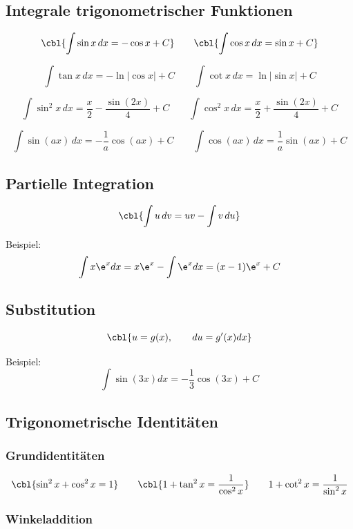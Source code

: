 \subsection{Integrale trigonometrischer Funktionen}

\[
\cbl{\int \sin x \, dx = - \cos x + C}
\qquad
\cbl{\int \cos x \, dx = \sin x + C}
\]

\[
\int \tan x \, dx = - \ln |\cos x| + C
\qquad
\int \cot x \, dx = \ln |\sin x| + C
\]

\[
\int \sin^2 x \, dx = \frac{x}{2} - \frac{\sin(2x)}{4} + C
\qquad
\int \cos^2 x \, dx = \frac{x}{2} + \frac{\sin(2x)}{4} + C
\]

\[
\int \sin(ax) \, dx = -\frac{1}{a}\cos(ax) + C
\qquad
\int \cos(ax) \, dx = \frac{1}{a}\sin(ax) + C
\]

\subsection{Partielle Integration}

\[
\cbl{\int u \, dv = u v - \int v \, du}
\]

Beispiel:
\[
\int x \e^{x} dx = x \e^{x} - \int \e^{x} dx = (x-1) \e^{x} + C
\]

\subsection{Substitution}

\[
\cbl{u = g(x), \qquad du = g'(x) dx}
\]

Beispiel:
\[
\int \sin(3x) dx
= -\frac{1}{3} \cos(3x) + C
\]

\subsection{Trigonometrische Identitäten}

\subsubsection{Grundidentitäten}

\[
\cbl{\sin^2 x + \cos^2 x = 1}
\qquad
\cbl{1 + \tan^2 x = \frac{1}{\cos^2 x}}
\qquad
1 + \cot^2 x = \frac{1}{\sin^2 x}
\]

\subsubsection{Winkeladdition}


